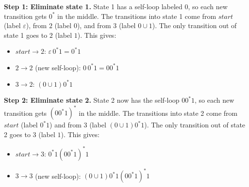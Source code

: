 \documentclass{article}
\theoremstyle{definition}
\newenvironment {solution}
{
\begin{tcolorbox}
}
{
\end{tcolorbox}
}
\begin{document}
\begin{enumerate}
\begin{solution}
              \medskip
              \textbf{Step 1: Eliminate state 1.}
              State 1 has a self-loop labeled $0$, so each new transition gets $0^*$ in the middle.
              The transitions into state 1 come from $start$ (label $\varepsilon$), from $2$ (label $0$), and from $3$ (label $0 \cup 1$).
              The only transition out of state 1 goes to $2$ (label $1$). This gives:
              \begin{itemize}
                  \item $start \to 2$: $\varepsilon\,0^*1 = 0^*1$
                  \item $2 \to 2$ (new self-loop): $0\,0^*1 = 00^*1$
                  \item $3 \to 2$: $(0 \cup 1)0^*1$
              \end{itemize}

              \begin{center}
              \end{center}
          \end{solution}

          \begin{solution}
              \textbf{Step 2: Eliminate state 2.}
              State 2 now has the self-loop $00^*1$, so each new transition gets $(00^*1)^*$ in the middle.
              The transitions into state 2 come from $start$ (label $0^*1$) and from $3$ (label $(0\cup1)0^*1$).
              The only transition out of state 2 goes to $3$ (label $1$). This gives:
              \begin{itemize}
                  \item $start \to 3$: $0^*1(00^*1)^*1$
                  \item $3 \to 3$ (new self-loop): $(0\cup1)0^*1(00^*1)^*1$
              \end{itemize}


\end{solution}
\end{enumerate}
\end{document}

